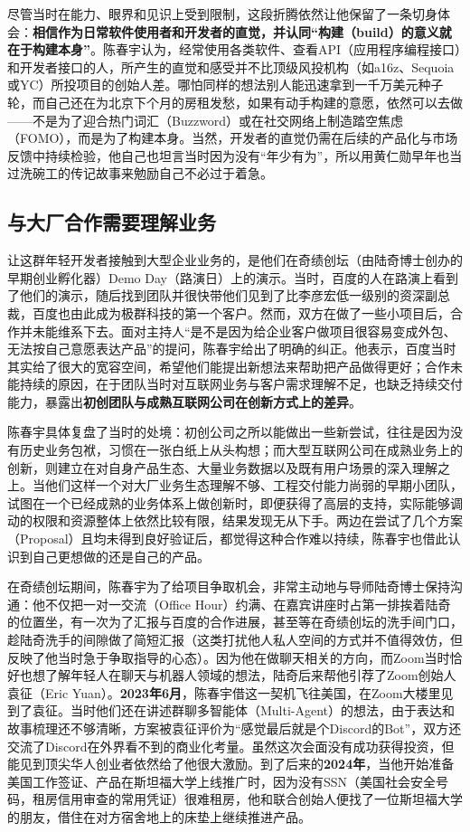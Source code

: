 \documentclass[UTF8,a4paper,11pt,fontset=fandol]{ctexart}
\begin{document}
尽管当时在能力、眼界和见识上受到限制，这段折腾依然让他保留了一条切身体会：\textbf{相信作为日常软件使用者和开发者的直觉，并认同“构建（build）的意义就在于构建本身”}。陈春宇认为，经常使用各类软件、查看API（应用程序编程接口）和开发者接口的人，所产生的直觉和感受并不比顶级风投机构（如a16z、Sequoia或YC）所投项目的创始人差。哪怕同样的想法别人能迅速拿到一千万美元种子轮，而自己还在为北京下个月的房租发愁，如果有动手构建的意愿，依然可以去做——不是为了迎合热门词汇（Buzzword）或在社交网络上制造踏空焦虑（FOMO），而是为了构建本身。当然，开发者的直觉仍需在后续的产品化与市场反馈中持续检验，他自己也坦言当时因为没有“年少有为”，所以用黄仁勋早年也当过洗碗工的传记故事来勉励自己不必过于着急。

\subsection{与大厂合作需要理解业务}
让这群年轻开发者接触到大型企业业务的，是他们在奇绩创坛（由陆奇博士创办的早期创业孵化器）Demo Day（路演日）上的演示。当时，百度的人在路演上看到了他们的演示，随后找到团队并很快带他们见到了比李彦宏低一级别的资深副总裁，百度也由此成为极群科技的第一个客户。然而，双方在做了一些小项目后，合作并未能维系下去。面对主持人“是不是因为给企业客户做项目很容易变成外包、无法按自己意愿表达产品”的提问，陈春宇给出了明确的纠正。他表示，百度当时其实给了很大的宽容空间，希望他们能提出新想法来帮助把产品做得更好；合作未能持续的原因，在于团队当时对互联网业务与客户需求理解不足，也缺乏持续交付能力，暴露出\textbf{初创团队与成熟互联网公司在创新方式上的差异}。

陈春宇具体复盘了当时的处境：初创公司之所以能做出一些新尝试，往往是因为没有历史业务包袱，习惯在一张白纸上从头构想；而大型互联网公司在成熟业务上的创新，则建立在对自身产品生态、大量业务数据以及既有用户场景的深入理解之上。当他们这样一个对大厂业务生态理解不够、工程交付能力尚弱的早期小团队，试图在一个已经成熟的业务体系上做创新时，即便获得了高层的支持，实际能够调动的权限和资源整体上依然比较有限，结果发现无从下手。两边在尝试了几个方案（Proposal）且均未得到良好验证后，都觉得这种合作难以持续，陈春宇也借此认识到自己更想做的还是自己的产品。

在奇绩创坛期间，陈春宇为了给项目争取机会，非常主动地与导师陆奇博士保持沟通：他不仅把一对一交流（Office Hour）约满、在嘉宾讲座时占第一排挨着陆奇的位置坐，有一次为了汇报与百度的合作进展，甚至等在奇绩创坛的洗手间门口，趁陆奇洗手的间隙做了简短汇报（这类打扰他人私人空间的方式并不值得效仿，但反映了他当时急于争取指导的心态）。因为他在做聊天相关的方向，而Zoom当时恰好也想了解年轻人在聊天与机器人领域的想法，陆奇后来帮他引荐了Zoom创始人袁征（Eric Yuan）。\textbf{2023年6月}，陈春宇借这一契机飞往美国，在Zoom大楼里见到了袁征。当时他们还在讲述群聊多智能体（Multi-Agent）的想法，由于表达和故事梳理还不够清晰，方案被袁征评价为“感觉最后就是个Discord的Bot”，双方还交流了Discord在外界看不到的商业化考量。虽然这次会面没有成功获得投资，但能见到顶尖华人创业者依然给了他很大激励。到了后来的\textbf{2024年}，当他开始准备美国工作签证、产品在斯坦福大学上线推广时，因为没有SSN（美国社会安全号码，租房信用审查的常用凭证）很难租房，他和联合创始人便找了一位斯坦福大学的朋友，借住在对方宿舍地上的床垫上继续推进产品。
\end{document}
